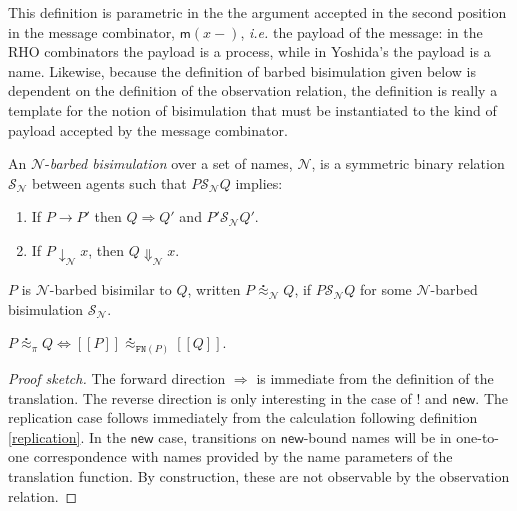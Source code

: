 \documentclass{llncs}
\newcommand{\new}{\mathsf{new}}
\newcommand{\ldb}{[\![}
\newcommand{\rdb}{]\!]}
\newcommand{\wbbisim}{\stackrel{\centerdot}{\approx}} %
\newcommand{\prefix}[3]{\mathsf{for}(#2 \leftarrow #1?) #3}
\newcommand{\red}{\rightarrow}
\newcommand{\wred}{\Rightarrow}
\newcommand{\rhoc}{$\rho$-calculus}
\begin{document}
This definition is parametric in the the argument accepted in the
second position in the message combinator, $\mathsf{m}(x-)$, {\em i.e.} the payload
of the message: in the RHO combinators the payload is a process,
while in Yoshida's the payload is a name. Likewise, because the
definition of barbed bisimulation given below is dependent on the
definition of the observation relation, the definition is really a
template for the notion of bisimulation that must be instantiated to
the kind of payload accepted by the message combinator.


\begin{definition}
An  ${\mathcal N}$-\emph{barbed bisimulation} over a set of names, ${\mathcal N}$, is a symmetric binary relation 
${\mathcal S}_{\mathcal N}$ between agents such that $P{\mathcal S}_{\mathcal N}Q$ implies:
\begin{enumerate}
\item If $P \red P'$ then $Q \wred Q'$ and $P'{\mathcal S}_{\mathcal N} Q'$.
\item If $P\downarrow_{\mathcal N} x$, then $Q\Downarrow_{\mathcal N} x$.
\end{enumerate}
$P$ is ${\mathcal N}$-barbed bisimilar to $Q$, written
$P \wbbisim_{\mathcal N} Q$, if $P {\mathcal S}_{\mathcal N} Q$ for some ${\mathcal N}$-barbed bisimulation ${\mathcal S}_{\mathcal N}$.
\end{definition}

\begin{theorem}
  $P \wbbisim_{\pi} Q \iff \ldb P \rdb \wbbisim_{\texttt{FN}(P)} \ldb Q \rdb$.
\end{theorem}

\begin{proof}[Proof sketch]
  The forward direction $\Rightarrow$ is immediate from the definition
  of the translation. The reverse direction is only interesting in the
  case of $!$ and $\mathsf{new}$. The replication case follows immediately
  from the calculation following definition \ref{replication}. 
  In the $\new$ case, transitions on $\mathsf{new}$-bound
  names will be in one-to-one correspondence with names provided by
  the name parameters of the translation function. By construction,
  these are not observable by the observation relation.
\end{proof}
\end{document}
